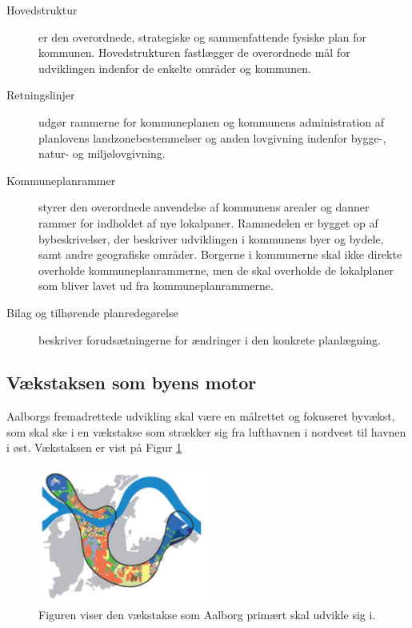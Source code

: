\begin{description}
\item [Hovedstruktur] er den overordnede, strategiske og sammenfattende fysiske plan for kommunen. Hovedstrukturen fastlægger de overordnede mål for udviklingen indenfor de enkelte områder og kommunen.
\item [Retningslinjer] udgør rammerne for kommuneplanen og kommunens administration af planlovens landzonebestemmelser og anden lovgivning indenfor bygge-, natur- og miljølovgivning.
\item [Kommuneplanrammer] styrer den overordnede anvendelse af kommunens arealer og danner rammer for indholdet af nye lokalpaner. Rammedelen er bygget op af bybeskrivelser, der beskriver udviklingen i kommunens byer og bydele, samt andre geografiske områder. Borgerne i kommunerne skal ikke direkte overholde kommuneplanrammerne, men de skal overholde de lokalplaner som bliver lavet ud fra kommuneplanrammerne.
\item [Bilag og tilhørende planredegørelse] beskriver forudsætningerne for ændringer i den konkrete planlægning. 
\end{description}

\subsection{Vækstaksen som byens motor}
Aalborgs fremadrettede udvikling skal være en målrettet og fokuseret byvækst, som skal ske i en vækstakse som strækker sig fra lufthavnen i nordvest til havnen i øst. Vækstaksen er vist på Figur \ref{fig:Vaekstakse1}

\begin{figure}[H] 
\centering
\includegraphics[width=0.50\textwidth]{billeder/Vaekstakse1}
\caption{Figuren viser den vækstakse som Aalborg primært skal udvikle sig i.}
\label{fig:Vaekstakse1}
\end{figure}

